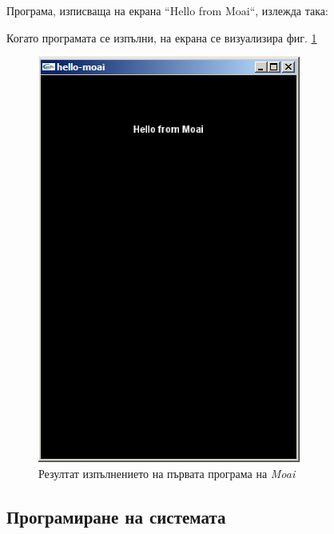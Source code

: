 			\newpage			
			
			Програма, изписваща на екрана ``Hello from Moai``, излежда така:
			
						
			
			Когато програмата се изпълни, на екрана се визуализира фиг. \ref{figure:hello-moai}
			
			\begin{figure} 
				\caption{Резултат изпълнението на първата програма на \emph{Moai}}
				\label{figure:hello-moai}
					\begin{center}
						\includegraphics{assets/images/hello-moai.png}				
					\end{center}
			\end{figure}
			
			\newpage

			
	\subsection{Програмиране на системата}